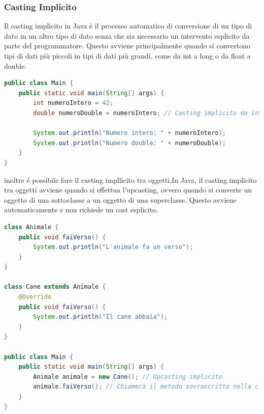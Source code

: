 \documentclass[11pt]{article}
\begin{document}
    \subsubsection{Casting Implicito}
    Il casting implicito in Java è il processo automatico di conversione di un tipo di dato in un altro tipo di dato senza che sia necessario un intervento esplicito da parte del programmatore. Questo avviene principalmente quando si convertono tipi di dati più piccoli in tipi di dati più grandi, come da int a long o da float a double.
    \begin{lstlisting}[language=Java]
public class Main {
    public static void main(String[] args) {
        int numeroIntero = 42;
        double numeroDouble = numeroIntero; // Casting implicito da int a double

        System.out.println("Numero intero: " + numeroIntero);
        System.out.println("Numero double: " + numeroDouble);
    }
}
    \end{lstlisting}
    inoltre é possibile fare il casting impllicito tra oggetti,In Java, il casting implicito tra oggetti avviene quando si effettua l'upcasting, ovvero quando si converte un oggetto di una sottoclasse a un oggetto di una superclasse. Questo avviene automaticamente e non richiede un cast esplicito.
    \begin{lstlisting}[language=Java]
class Animale {
    public void faiVerso() {
        System.out.println("L'animale fa un verso");
    }
}

class Cane extends Animale {
    @Override
    public void faiVerso() {
        System.out.println("Il cane abbaia");
    }
}

public class Main {
    public static void main(String[] args) {
        Animale animale = new Cane(); // Upcasting implicito
        animale.faiVerso(); // Chiamerà il metodo sovrascritto nella classe Cane
    }
}
    \end{lstlisting}
\end{document}
